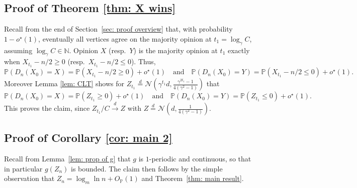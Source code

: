 \documentclass[11pt]{article}
\newcommand{\Prob}{\mathbb{P}}
\numberwithin{theorem}{section}
\begin{document}
\subsection{Proof of Theorem \ref{thm: X wins}}

Recall from the end of Section~\ref{sec: proof overview} that, with probability $1-o^\star(1)$, eventually all vertices agree on the majority opinion at $t_1 = \log_\gamma C$, assuming $\log_\gamma C \in \mathbb{N}$. Opinion $X$ (resp.~$Y$) is the majority opinion at $t_1$ exactly when $X_{t_1}-n/2 \geq 0$ (resp.~$X_{t_1}-n/2\leq 0$). Thus,
\[
\Prob(D_n(X_0)=X)=\Prob(X_{t_1}-n/2 \geq 0) + o^\star(1)\quad \text{and}\quad \Prob(D_n(X_0)=Y)=\Prob(X_{t_1}-n/2\leq 0)+o^\star(1).
\]
Moreover Lemma \ref{lem: CLT} shows for $Z_{t_1}\stackrel{d}{=} \mathcal{N}\left(\gamma^{t_1}d, \frac{\gamma^{2t_1}-1}{4(\gamma^2-1)} \right)$ that
\[
\Prob(D_n(X_0)=X) = \Prob(Z_{t_1}\geq 0)+o^\star(1)
\quad\text{and}\quad
\Prob(D_n(X_0)=Y)=\Prob(Z_{t_1}\leq 0)+o^\star(1).
\]
This proves the claim, since $Z_{t_1}/C \stackrel{d}{\to} Z$ with $Z\stackrel{d}{=}\mathcal{N}\left(d,\frac{1}{4(\gamma^2-1)}\right)$.


\subsection{Proof of Corollary \ref{cor: main 2}}


Recall from Lemma~\ref{lem: prop of g} that $g$ is $1$-periodic and continuous, so that in particular $g(Z_n)$ is bounded. The claim then follows by the simple observation that $Z_n = \log_m\ln n + O_{\mathbb{P}}(1)$ and Theorem~\ref{thm: main result}.
\end{document}
